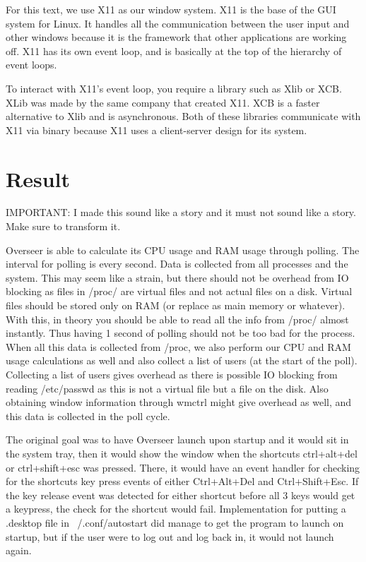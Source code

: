\documentclass[12pt]{article}
\begin{document}
For this text, we use X11 as our window system.
X11 is the base of the GUI system for Linux.
It handles all the communication between the user input and other windows because it is the framework that other applications are working off.
X11 has its own event loop, and is basically at the top of the hierarchy of event loops.

To interact with X11's event loop, you require a library such as Xlib or XCB.
XLib was made by the same company that created X11.
XCB is a faster alternative to Xlib and is asynchronous.
Both of these libraries communicate with X11 via binary because X11 uses a client-server design for its system.


	
\section{Result}

IMPORTANT: I made this sound like a story and it must not sound like a story. Make sure to transform it.

Overseer is able to calculate its CPU usage and RAM usage through polling.
The interval for polling is every second.
Data is collected from all processes and the system.
This may seem like a strain, but there should not be overhead from IO blocking as files in /proc/ are virtual files and not actual files on a disk. Virtual files should be stored only on RAM (or replace as main memory or whatever).
With this, in theory you should be able to read all the info from /proc/ almost instantly.
Thus having 1 second of polling should not be too bad for the process.
When all this data is collected from /proc, we also perform our CPU and RAM usage calculations as well and also collect a list of users (at the start of the poll).
Collecting a list of users gives overhead as there is possible IO blocking from reading /etc/passwd as this is not a virtual file but a file on the disk.
Also obtaining window information through wmctrl might give overhead as well, and this data is collected in the poll cycle.

The original goal was to have Overseer launch upon startup and it would sit in the system tray, then it would show the window when the shortcuts ctrl+alt+del or ctrl+shift+esc was pressed.
There, it would have an event handler for checking for the shortcuts key press events of either Ctrl+Alt+Del and Ctrl+Shift+Esc.
If the key release event was detected for either shortcut before all 3 keys would get a keypress, the check for the shortcut would fail.
Implementation for putting a .desktop file in ~/.conf/autostart did manage to get the program to launch on startup, but if the user were to log out and log back in, it would not launch again.
\end{document}
